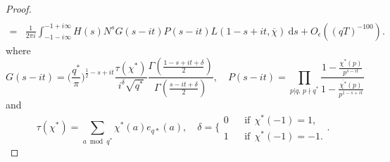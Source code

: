 \documentclass[12pt]{amsart}
\theoremstyle{definition}
\theoremstyle{plain}
\theoremstyle{remark}
\numberwithin{equation}{section}
\numberwithin{theorem}{section}
\numberwithin{equation}{section}
\begin{document}
\begin{proof}
\begin{align*}
			\\
			=&
			\frac{1}{2\pi i}\int_{-1-i\infty}^{-1+i\infty}H(s)N^{s}G(s-it)P(s-it)L(1-s+it, \overline{\chi})\:\mathrm{d}s
			+O_{\epsilon}((qT)^{-100}).
		\end{align*}
		where
		\[G(s-it)=\bigg(\frac{q^*}{\pi}\bigg)^{\frac{1}{2}-s+it}\frac{\tau(\chi^{*})}{i^{\delta}\sqrt{q^*}}\frac{\Gamma(\frac{1-s+it+\delta}{2})}{\Gamma(\frac{s-it+\delta}{2})},\quad P(s-it) = \prod_{p | q,\, p\nmid q^{*}}\frac{1-\frac{\chi^{*}(p)}{p^{s-it}}}{1-\frac{\overline{\chi^{*}}(p)}{p^{1-s+it}}}\]
		and 
		\begin{equation*} \tau(\chi^{*})=\sum_{a \bmod q^* }\chi^{*}(a)e_{q*}(a), \quad   \delta=\bigg\{
			\begin{array}{rcl}
				0     &      &\mbox{if} \ \ \chi^{*}(-1)=1,       \\
				1              &      & \mbox{if} \ \  \chi^{*}(-1)=-1.
			\end{array} \bigg.
		\end{equation*}
		

\end{proof}
\end{document}
